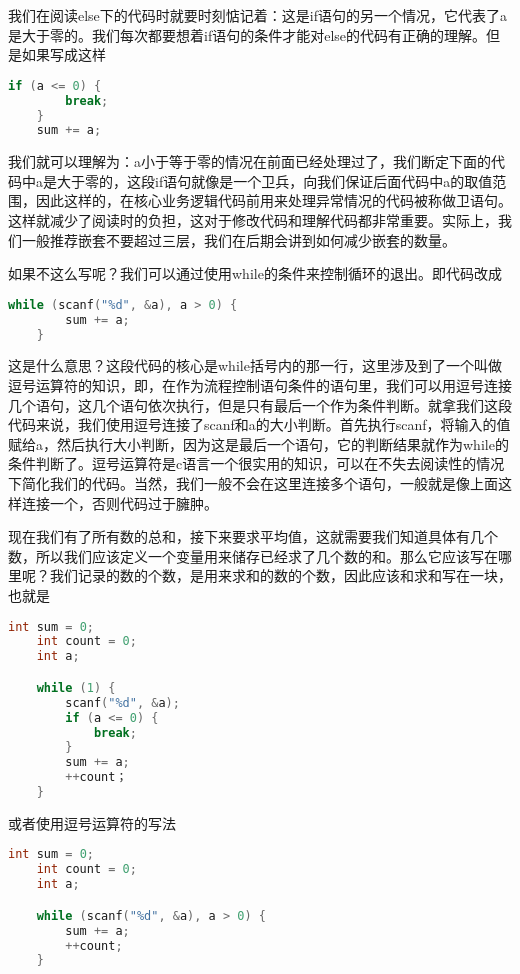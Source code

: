 我们在阅读else下的代码时就要时刻惦记着：这是if语句的另一个情况，它代表了a是大于零的。我们每次都要想着if语句的条件才能对else的代码有正确的理解。但是如果写成这样

\begin{lstlisting}[language=C]
    if (a <= 0) {
        break;
    }
    sum += a;
\end{lstlisting}

我们就可以理解为：a小于等于零的情况在前面已经处理过了，我们断定下面的代码中a是大于零的，这段if语句就像是一个卫兵，向我们保证后面代码中a的取值范围，因此这样的，在核心业务逻辑代码前用来处理异常情况的代码被称做卫语句。这样就减少了阅读时的负担，这对于修改代码和理解代码都非常重要。实际上，我们一般推荐嵌套不要超过三层，我们在后期会讲到如何减少嵌套的数量。

如果不这么写呢？我们可以通过使用while的条件来控制循环的退出。即代码改成

\begin{lstlisting}[language=C]
    while (scanf("%d", &a), a > 0) {
        sum += a;
    }
\end{lstlisting}

这是什么意思？这段代码的核心是while括号内的那一行，这里涉及到了一个叫做逗号运算符的知识，即，在作为流程控制语句条件的语句里，我们可以用逗号连接几个语句，这几个语句依次执行，但是只有最后一个作为条件判断。就拿我们这段代码来说，我们使用逗号连接了scanf和a的大小判断。首先执行scanf，将输入的值赋给a，然后执行大小判断，因为这是最后一个语句，它的判断结果就作为while的条件判断了。逗号运算符是c语言一个很实用的知识，可以在不失去阅读性的情况下简化我们的代码。当然，我们一般不会在这里连接多个语句，一般就是像上面这样连接一个，否则代码过于臃肿。

现在我们有了所有数的总和，接下来要求平均值，这就需要我们知道具体有几个数，所以我们应该定义一个变量用来储存已经求了几个数的和。那么它应该写在哪里呢？我们记录的数的个数，是用来求和的数的个数，因此应该和求和写在一块，也就是

\begin{lstlisting}[language=C]
    int sum = 0;
    int count = 0;
    int a;

    while (1) {
        scanf("%d", &a);
        if (a <= 0) {
            break;
        }
        sum += a;
        ++count；
    }
\end{lstlisting}

或者使用逗号运算符的写法

\begin{lstlisting}[language=C]
    int sum = 0;
    int count = 0;
    int a;

    while (scanf("%d", &a), a > 0) {
        sum += a;
        ++count;
    }
\end{lstlisting}

